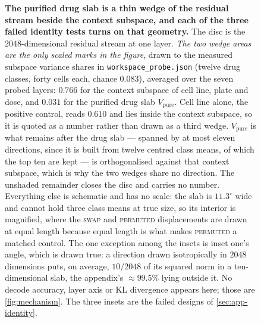 \begin{figure}[htbp]
\begin{fullwidth}

\caption[The drug slab and the context subspace, by variance
share]{\textbf{The purified drug slab is a thin wedge of the residual stream
beside the context subspace, and each of the three failed identity tests turns
on that geometry.} The disc is the
$2048$-dimensional residual stream at one layer. \emph{The two wedge areas are
the only scaled marks in the figure}, drawn to the measured subspace variance
shares in \texttt{workspace\_probe.json} (twelve drug classes, forty cells
each, chance $0.083$), averaged over the seven probed layers: $0.766$ for the
context subspace of cell line, plate and dose, and $0.031$ for the purified
drug slab $V_{\mathrm{pure}}$. Cell line alone, the positive control, reads
$0.610$ and lies inside the context subspace, so it is quoted as a number
rather than drawn as a third wedge. $V_{\mathrm{pure}}$ is what remains after
the drug slab --- spanned by at most eleven directions, since it is built from
twelve centred class means, of which the top ten are kept --- is orthogonalised
against that context subspace, which is why the two wedges share no direction.
The unshaded remainder closes the disc and carries no number. Everything else
is schematic and has no scale: the slab is $11.3^{\circ}$ wide and cannot hold
three class means at true size, so its interior is magnified, where the
\textsc{swap} and \textsc{permuted} displacements are drawn at equal length
because equal length is what makes \textsc{permuted} a matched control. The one
exception among the insets is inset one's angle, which is drawn true: a
direction drawn isotropically in $2048$ dimensions puts, on average, $10/2048$
of its squared norm in a ten-dimensional slab, the appendix's $\approx 99.5\%$
lying outside it. No decode accuracy, layer axis or KL divergence appears here;
those are \cref{fig:mechanism}. The three insets are the failed designs of
\cref{sec:app-identity}.}
\label{fig:slab}
\end{fullwidth}
\end{figure}

